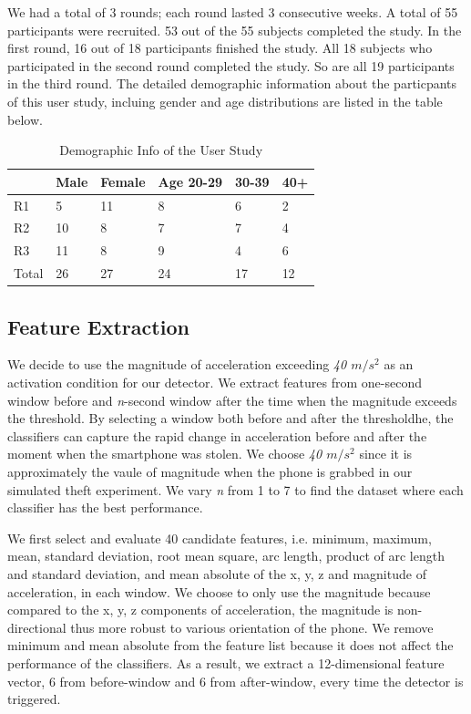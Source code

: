 \documentclass{soups}
\begin{document}
We had a total of 3 rounds; each round lasted 3 consecutive weeks. 
A total of 55 participants were recruited. 
53 out of the 55 subjects completed the study. 
In the first round, 16 out of 18 participants finished the study. 
All 18 subjects who participated in the second round completed the study. 
So are all 19 participants in the third round. 
The detailed demographic information about the particpants of this user study, incluing gender and age distributions are listed in the table below.

\begin{table}[H]
\centering
\begin{tabular}{llllll}
\hline
      & Male & Female & Age 20-29 & 30-39 & 40+ \\ \hline
R1    & 5    & 11     & 8         & 6     & 2   \\
R2    & 10   & 8      & 7         & 7     & 4   \\
R3    & 11   & 8      & 9         & 4     & 6   \\
Total & 26   & 27     & 24        & 17    & 12  \\ \hline
\end{tabular}
\caption{Demographic Info of the User Study}
\label{my-label}
\end{table}




\subsection{Feature Extraction}

We decide to use the magnitude of acceleration exceeding \textit{40 $m/s^2$} as an activation condition for our detector. 
We extract features from one-second window before and \textit{n}-second window after the time when the magnitude exceeds the threshold. 
By selecting a window both before and after the thresholdhe, the classifiers can capture the rapid change in acceleration before and after the moment when the smartphone was stolen. 
We choose \textit{40 $m/s^2$} since it is approximately the vaule of magnitude when the phone is grabbed in our simulated theft experiment. 
We vary \textit{n} from 1 to 7 to find the dataset where each classifier has the best performance.

We first select and evaluate 40 candidate features, i.e. minimum, maximum, mean, standard deviation, root mean square, arc length, product of arc length and standard deviation, and mean absolute of the x, y, z and magnitude of acceleration, in each window. 
We choose to only use the magnitude because compared to the x, y, z components of acceleration, the magnitude is non-directional thus more robust to various orientation of the phone. 
We remove minimum and mean absolute from the feature list because it does not affect the performance of the classifiers. 
As a result, we extract a 12-dimensional feature vector, 6 from before-window and 6 from after-window, every time the detector is triggered.
\end{document}
